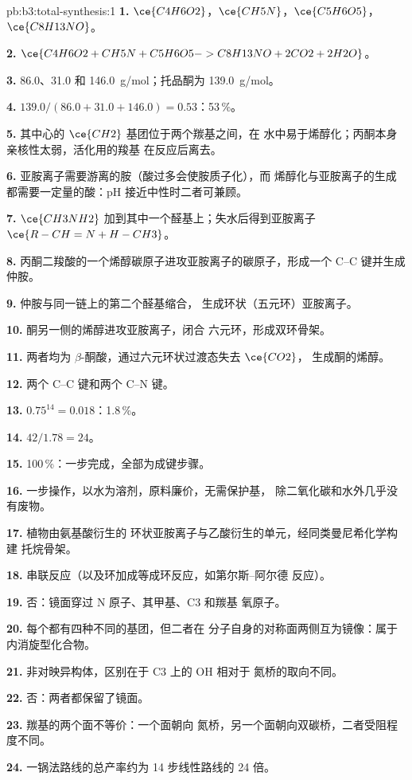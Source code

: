 \begin{solution}{pb:b3:total-synthesis:1}
\textbf{1.} $\ce{C4H6O2}$，$\ce{CH5N}$，$\ce{C5H6O5}$，$\ce{C8H13NO}$。

\textbf{2.} $\ce{C4H6O2 + CH5N + C5H6O5 -> C8H13NO + 2CO2 + 2H2O}$。

\textbf{3.} 86.0、31.0 和 \qty{146.0}{g/mol}；托品酮为 \qty{139.0}{g/mol}。

\textbf{4.} $139.0/(86.0 + 31.0 + 146.0) = 0.53$：53\,\%。

\textbf{5.} 其中心的 $\ce{CH2}$ 基团位于两个羰基之间，在
水中易于烯醇化；丙酮本身亲核性太弱，活化用的羧基
在反应后离去。

\textbf{6.} 亚胺离子需要游离的胺（酸过多会使胺质子化），而
烯醇化与亚胺离子的生成都需要一定量的酸：pH 接近中性时二者可兼顾。

\textbf{7.} $\ce{CH3NH2}$ 加到其中一个醛基上；失水后得到亚胺离子
$\ce{R-CH=N+H-CH3}$。

\textbf{8.} 丙酮二羧酸的一个烯醇碳原子进攻亚胺离子的碳原子，形成一个
C--C 键并生成仲胺。

\textbf{9.} 仲胺与同一链上的第二个醛基缩合，
生成环状（五元环）亚胺离子。

\textbf{10.} 酮另一侧的烯醇进攻亚胺离子，闭合
六元环，形成双环骨架。

\textbf{11.} 两者均为 $\beta$-酮酸，通过六元环状过渡态失去 $\ce{CO2}$，
生成酮的烯醇。

\textbf{12.} 两个 C--C 键和两个 C--N 键。

\textbf{13.} $0.75^{14} = 0.018$：1.8\,\%。

\textbf{14.} $42/1.78 = 24$。

\textbf{15.} 100\,\%：一步完成，全部为成键步骤。

\textbf{16.} 一步操作，以水为溶剂，原料廉价，无需保护基，
除二氧化碳和水外几乎没有废物。

\textbf{17.} 植物由氨基酸衍生的
环状亚胺离子与乙酸衍生的单元，经同类曼尼希化学构建
托烷骨架。

\textbf{18.} 串联反应（以及环加成等成环反应，如第尔斯–阿尔德
反应）。

\textbf{19.} 否：镜面穿过 N 原子、其甲基、C3 和羰基
氧原子。

\textbf{20.} 每个都有四种不同的基团，但二者在
分子自身的对称面两侧互为镜像：属于内消旋型化合物。

\textbf{21.} 非对映异构体，区别在于 C3 上的 OH 相对于
氮桥的取向不同。

\textbf{22.} 否：两者都保留了镜面。

\textbf{23.} 羰基的两个面不等价：一个面朝向
氮桥，另一个面朝向双碳桥，二者受阻程度不同。

\textbf{24.} 一锅法路线的总产率约为 14 步线性路线的
24 倍。
\end{solution}
